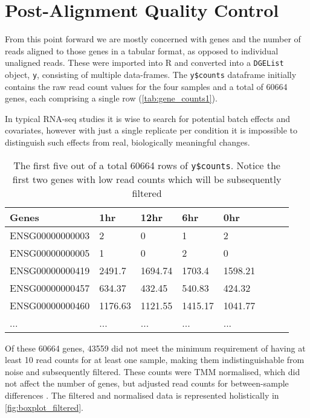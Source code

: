 
\section{Post-Alignment Quality Control}
From this point forward we are mostly concerned with genes and the number of reads aligned to those genes in a tabular format, as opposed to individual unaligned reads. These were imported into R and converted into a \texttt{DGEList} object, \texttt{y}, consisting of multiple data-frames. The \texttt{y\$counts} dataframe initially contains the raw read count values for the four samples and a total of 60664 genes, each comprising a single row (\autoref{tab:gene_counts1}). 

In typical RNA-seq studies it is wise to search for potential batch effects and covariates, however with just a single replicate per condition it is impossible to distinguish such effects from real, biologically meaningful changes.

\begin{table}[h]
\centering
\caption{The first five out of a total 60664 rows of \texttt{y\$counts}. Notice the first two genes with low read counts which will be subsequently filtered }
\label{tab:gene_counts1}
\begin{tabular}{llllllll}
\toprule
\textbf{Genes}           & \textbf{1hr}     & \textbf{12hr}    & \textbf{6hr}     & \textbf{0hr}      \\ \midrule
ENSG00000000003 & 2       & 0       & 1       & 2        \\
ENSG00000000005 & 1       & 0       & 2       & 0        \\
ENSG00000000419 & 2491.7  & 1694.74 & 1703.4  & 1598.21  \\
ENSG00000000457 & 634.37  & 432.45  & 540.83  & 424.32   \\
ENSG00000000460 & 1176.63 & 1121.55 & 1415.17 & 1041.77  \\
...             & ...     & ...     & ...     & ... \\  \bottomrule
\end{tabular}
\end{table}

Of these 60664 genes, 43559 did not meet the minimum requirement of having at least 10 read counts for at least one sample, making them indistinguishable from noise and subsequently filtered. These counts were \ac{TMM} normalised, which did not affect the number of genes, but adjusted  read counts for between-sample differences \citep{robinson2010scaling}. The filtered and normalised data is represented holistically in \autoref{fig:boxplot_filtered}.


